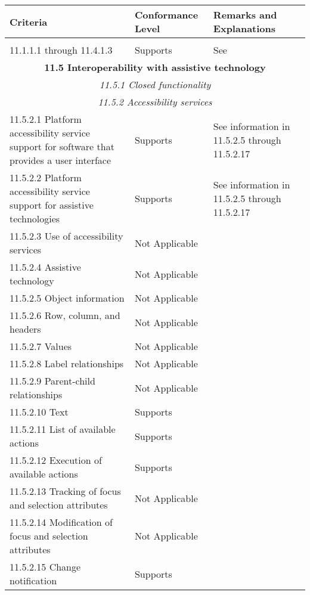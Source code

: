\documentclass{report}
\begin{document}
\begin{longtable}{p{}<{\RaggedRight}p{}<{\RaggedRight}p{}<{\RaggedRight}}
  \toprule
  Criteria & Conformance Level & Remarks and Explanations \\
  \midrule
  \endhead
  \bottomrule
  \endfoot
  \multicolumn{3}{c}{\bfseries 11.0 General (informative)}\\*
  11.1.1.1 through 11.4.1.3 & Supports & See \nameref{sec:wcag}\\
  \multicolumn{3}{c}{\bfseries 11.5 Interoperability with assistive
  technology} \\*
  \multicolumn{3}{c}{\itshape 11.5.1 Closed functionality}\\*
  \multicolumn{3}{c}{\itshape 11.5.2 Accessibility services}\\*
  11.5.2.1 Platform accessibility service support for software that
  provides a user interface & Supports & See information in 11.5.2.5
                                         through 11.5.2.17\\  
  11.5.2.2 Platform accessibility service support for assistive
  technologies & Supports & See information in 11.5.2.5 through 11.5.2.17\\
  11.5.2.3 Use of accessibility services & Not Applicable\\
  11.5.2.4 Assistive technology & Not Applicable\\
  11.5.2.5 Object information & Not Applicable\\
  11.5.2.6 Row, column, and headers & Not Applicable \\
  11.5.2.7 Values & Not Applicable\\
  11.5.2.8 Label relationships & Not Applicable \\
  11.5.2.9 Parent-child relationships & Not Applicable\\
  11.5.2.10 Text & Supports \\
  11.5.2.11 List of available actions & Supports \\
  11.5.2.12 Execution of available actions & Supports\\
  11.5.2.13 Tracking of focus and selection attributes & Not
                                                         Applicable \\
  11.5.2.14 Modification of focus and selection attributes & Not
                                                             Applicable \\
  11.5.2.15 Change notification & Supports\\

\end{longtable}
\end{document}
